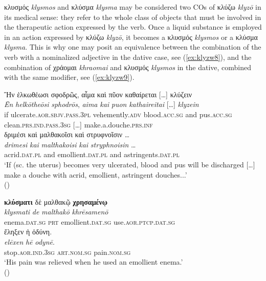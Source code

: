 \documentclass[output=paper,colorlinks,citecolor=brown]{langscibook}
\begin{document}
κλυσμός \textit{klysmos} and κλύσμα \textit{klysma} may be considered two COs of κλύζω \textit{klyzō} in its medical sense: they refer to the whole class of objects that must be involved in the therapeutic action expressed by the verb. Once a liquid substance is employed in an action expressed by κλύζω \textit{klyzō}, it becomes a κλυσμός \textit{klysmos} or a κλύσμα \textit{klysma}. This is why one may posit an equivalence between the combination of the verb with a nominalized adjective in the dative case, see (\ref{ex:klyzw8}), and the combination of χράομαι \textit{khraomai} and κλυσμός \textit{klysmos} in the dative, combined with the same modifier, see (\ref{ex:klyzw9}). 

\begin{exe}
\ex\label{ex:klyzw8}
\glll Ἢν ἑλκωθέωσι σφοδρῶς, αἷμα καὶ πῦον καθαίρεται […] κλύζειν \\ 
\textit{Ēn} \textit{helkōtheōsi} \textit{sphodrōs}, \textit{aima} \textit{kai} \textit{puon} \textit{kathaireitai} […] \textit{klyzein} \\
if ulcerate.\textsc{aor.sbjv.pass.3pl} vehemently.\textsc{adv} blood.\textsc{acc.sg} and pus.\textsc{acc.sg} clean.\textsc{prs.ind.pass.3sg} […] make.a.douche.\textsc{prs.inf}  \\

\glll δριμέσι καὶ μαλθακοῖσι καὶ στρυφνοῖσιν … \\
\textit{drimesi} \textit{kai} \textit{malthakoisi} \textit{kai} \textit{stryphnoisin} … \\
acrid.\textsc{dat.pl} and emollient.\textsc{dat.pl} and astringents.\textsc{dat.pl} \\
\glt ‘If (sc. the uterus) becomes very ulcerated, blood and pus will be discharged […] make a douche with acrid, emollient, astringent douches...' \\
\hspace*{\fill}()
\end{exe}

\begin{exe}
\ex\label{ex:klyzw9}
\glll \textbf{κλύσματι} δὲ μαλθακῷ \textbf{χρησαμένῳ}  \\ 
\textit{klysmati} \textit{de} \textit{malthakō} \textit{khrēsamenō}  \\
enema.\textsc{dat.sg} \textsc{prt} emollient.\textsc{dat.sg} use.\textsc{aor.ptcp.dat.sg}  \\

\glll ἔληξεν ἡ ὀδύνη. \\
\textit{elēxen} \textit{hē} \textit{odynē}. \\
stop.\textsc{aor.ind.3sg} \textsc{art.nom.sg} pain.\textsc{nom.sg} \\
\glt ‘His pain was relieved when he used an emollient enema.' \\
\hspace*{\fill}()
\end{exe}
\end{document}
